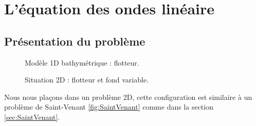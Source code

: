 \section{L'équation des ondes linéaire}
\subsection{Présentation du problème}

\begin{figure}[H]
	\centering
	\caption{Modèle 1D bathymétrique : flotteur.}
\end{figure}

\begin{figure}[H]
	\centering
	\caption{Situation 2D : flotteur et fond variable.}
\end{figure}
\noindent Nous nous plaçons dans un problème 2D, cette configuration est similaire à un problème de Saint-Venant \ref{fig:SaintVenant} comme dans la section \ref{sec:SaintVenant}.\\

